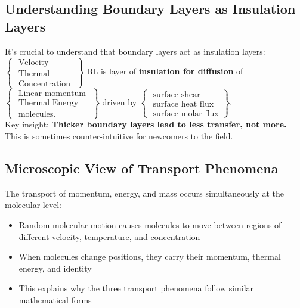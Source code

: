 \subsection*{Understanding Boundary Layers as Insulation Layers}
It's crucial to understand that boundary layers act as insulation layers:
\\[1em]
$\left\{\begin{array}{l}
        \text { Velocity } 
        \\ 
        \text { Thermal } 
        \\ 
        \text { Concentration }
       \end{array}
\right\}$ 
BL is layer of \textbf{insulation for diffusion } of 
$\left\{\begin{array}{l}
    \text { Linear momentum } 
    \\ 
    \text { Thermal Energy } 
    \\ 
    \text { molecules. }
    \end{array}
\right\}$
driven by 
$\left\{\begin{array}{l}
        \text { surface shear } 
        \\ 
        \text { surface heat flux } 
        \\ 
        \text { surface molar flux}
        \end{array}\right\}
$.
\\[1em]
Key insight: \textbf{Thicker boundary layers lead to less transfer, not more.} This is sometimes counter-intuitive for newcomers to the field.
\subsection*{Microscopic View of Transport Phenomena}

The transport of momentum, energy, and mass occurs simultaneously at the molecular level:
\begin{itemize}
    \item Random molecular motion causes molecules to move between regions of different velocity, temperature, and concentration
    \item When molecules change positions, they carry their momentum, thermal energy, and identity
    \item This explains why the three transport phenomena follow similar mathematical forms
\end{itemize}

